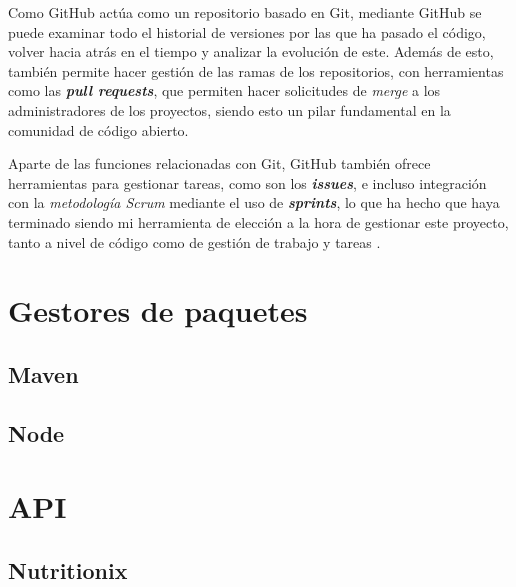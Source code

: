 Como GitHub actúa como un repositorio basado en Git, mediante GitHub se puede examinar todo el historial de versiones por las que ha pasado el código, volver hacia atrás en el tiempo y analizar la evolución de este. Además de esto, también permite hacer gestión de las ramas de los repositorios, con herramientas como las \textit{\textbf{pull requests}}, que permiten hacer solicitudes de \textit{merge} a los administradores de los proyectos, siendo esto un pilar fundamental en la comunidad de código abierto.

Aparte de las funciones relacionadas con Git, GitHub también ofrece herramientas para gestionar tareas, como son los \textit{\textbf{issues}}, e incluso integración con la \textit{metodología Scrum} mediante el uso de \textit{\textbf{sprints}}, lo que ha hecho que haya terminado siendo mi herramienta de elección a la hora de gestionar este proyecto, tanto a nivel de código como de gestión de trabajo y tareas \cite{wikipedia:github}.


\section{Gestores de paquetes}


\subsection{Maven}


\subsection{Node}



\section{API}


\subsection{Nutritionix}


